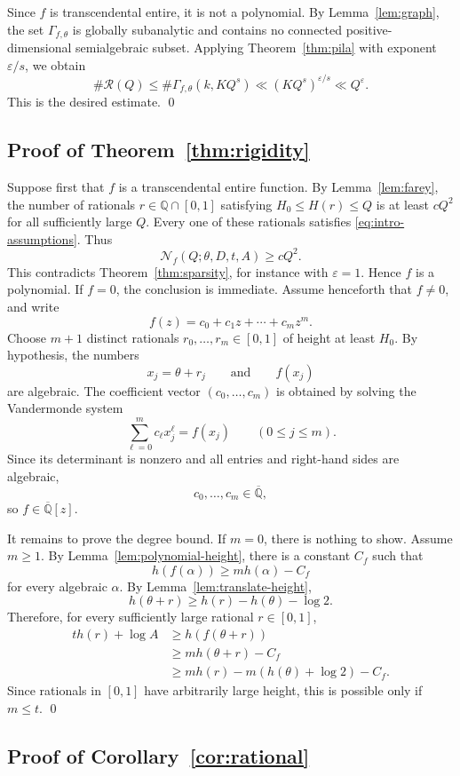 \documentclass[11pt]{amsart}
\theoremstyle{remark}
\newcommand{\Q}{\mathbb{Q}}
\newcommand{\Qbar}{\overline{\mathbb{Q}}}
\begin{document}
Since $f$ is transcendental entire, it is not a polynomial. By
Lemma~\ref{lem:graph}, the set $\Gamma_{f,\theta}$ is globally subanalytic
and contains no connected positive-dimensional semialgebraic subset.
Applying Theorem~\ref{thm:pila} with exponent $\varepsilon/s$, we obtain
\[
\#\mathcal R(Q)
\leq
\#\Gamma_{f,\theta}(k,KQ^s)
\ll
(KQ^s)^{\varepsilon/s}
\ll Q^{\varepsilon}.
\]
This is the desired estimate.
\qed

\subsection{Proof of Theorem~\ref{thm:rigidity}}

Suppose first that $f$ is a transcendental entire function. By Lemma~\ref{lem:farey}, the number of rationals $r\in\Q\cap[0,1]$ satisfying $H_0\leq H(r)\leq Q$ is at least $cQ^2$ for all sufficiently large $Q$. Every one of these rationals satisfies \eqref{eq:intro-assumptions}. Thus
\[
\mathcal N_f(Q;\theta,D,t,A)
\geq cQ^2.
\]
This contradicts Theorem~\ref{thm:sparsity}, for instance with $\varepsilon=1$. Hence $f$ is a polynomial. If $f=0$, the conclusion is immediate. Assume henceforth that $f\neq0$, and write
\[
f(z)=c_0+c_1z+\cdots+c_mz^m.
\]
Choose $m+1$ distinct rationals $r_0,\ldots,r_m\in[0,1]$ of height at least $H_0$. By hypothesis, the numbers
\[
x_j=\theta+r_j
\qquad\text{and}\qquad
f(x_j)
\]
are algebraic. The coefficient vector $(c_0,\ldots,c_m)$ is obtained by solving the Vandermonde system
\[
\sum_{\ell=0}^{m}c_\ell x_j^\ell=f(x_j)
\qquad(0\leq j\leq m).
\]
Since its determinant is nonzero and all entries and right-hand sides are algebraic,
\[
c_0,\ldots,c_m\in\Qbar,
\]
so $f\in\Qbar[z]$.

It remains to prove the degree bound. If $m=0$, there is nothing to show. Assume $m\geq1$. By Lemma~\ref{lem:polynomial-height}, there is a constant $C_f$ such that
\[
h(f(\alpha))
\geq m h(\alpha)-C_f
\]
for every algebraic $\alpha$. By Lemma~\ref{lem:translate-height},
\[
h(\theta+r)
\geq h(r)-h(\theta)-\log2.
\]
Therefore, for every sufficiently large rational $r\in[0,1]$,
\[
\begin{aligned}
t h(r)+\log A
&\geq h(f(\theta+r))\\
&\geq m h(\theta+r)-C_f\\
&\geq m h(r)-m(h(\theta)+\log2)-C_f.
\end{aligned}
\]
Since rationals in $[0,1]$ have arbitrarily large height, this is possible only if $m\leq t$.
\qed

\subsection{Proof of Corollary~\ref{cor:rational}}
\end{document}
